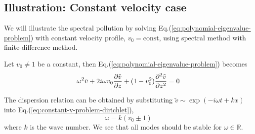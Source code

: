 \subsection{Illustration: Constant velocity case}
We will illustrate the spectral pollution by solving Eq.(\ref{eq:polynomial-eigenvalue-problem}) with constant velocity profile, $v_0=\text{const}$, using spectral method with finite-difference method.

Let $v_0\neq 1$ be a constant, then Eq.(\ref{eq:polynomial-eigenvalue-problem}) becomes 
\begin{equation} \label{eq:constant-v-problem-dirichlet}
  \omega^2\tilde{v} + 2i\omega v_0\pdv{\tilde{v}}{z} + (1-v_0^2)\pdv[2]{\tilde{v}}{z} = 0
\end{equation}

The dispersion relation can be obtained by substituting $\tilde{v} \sim \exp(-i\omega t + kx)$ into Eq.(\ref{eq:constant-v-problem-dirichlet}),
\begin{equation} \label{dispersion-relation}
	\omega = k(v_0 \pm 1) 
\end{equation}
where $k$ is the wave number. We see that all modes should be stable for $\omega\in\mathbb{R}$.

